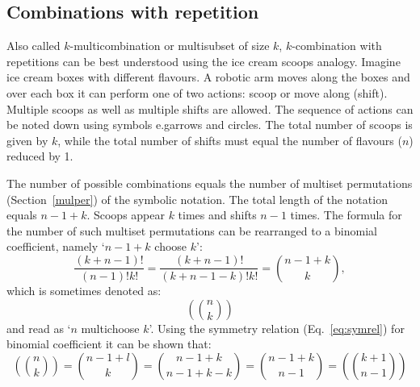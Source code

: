\documentclass{article}
\makeatletter
\newcommand*{\eg}{e.g\@ifnextchar{.}{}{.\@\xspace}}
\makeatother
\begin{document}
\subsection{Combinations with repetition}

Also called $k$\nobreakdash-\hspace{0pt}multicombination or multisubset of size $k$, $k$\nobreakdash-\hspace{0pt}combination with repetitions can be best understood using the ice cream scoops analogy.\cite{mathsisfun}
Imagine ice cream boxes with different flavours.
A robotic arm moves along the boxes and over each box it can perform one of two actions: scoop or move along (shift).
Multiple scoops as well as multiple shifts are allowed.
The sequence of actions can be noted down using symbols \eg arrows and circles.
The total number of scoops is given by $k$, while the total number of shifts must equal the number of flavours ($n$) reduced by 1.

The number of possible combinations equals the number of multiset permutations (Section~\ref{mulper}) of the symbolic notation.
The total length of the notation equals $n-1+k$.
Scoops appear $k$ times and shifts $n-1$ times.
The formula for the number of such multiset permutations can be rearranged to a binomial coefficient, namely `$n-1+k$ choose $k$':
\begin{equation}
    \frac{(k+n-1)!}{(n-1)!k!} = \frac{(k+n-1)!}{(k+n-1-k)!k!} = \binom{n-1+k}{k},
\end{equation}
which is sometimes denoted as:
\begin{equation*}
    \left(\!\!\!\binom{n}{k}\!\!\!\right)
\end{equation*}
%
and read as `$n$ multichoose $k$'. Using the symmetry relation (Eq.~\ref{eq:symrel}) for binomial coefficient it can be shown that:
%
\begin{equation}
    \left(\!\!\!\binom{n}{k}\!\!\!\right) = \binom{n-1+l}{k} = \binom{n-1+k}{n-1+k-k} = \binom{n-1+k}{n-1} = \left(\!\!\!\binom{k+1}{n-1}\!\!\!\right)
\end{equation}
\end{document}
